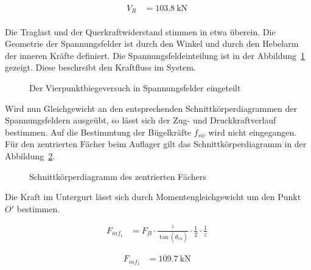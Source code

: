 \documentclass[
  11pt,
  letterpaper,
]{scrreprt}
\begin{document}
$$
\begin{aligned}
V_{R_{_{}}} &= 103.8\ \mathrm{kN} \;
\end{aligned}
$$

Die Traglast und der Querkraftwiderstand stimmen in etwa überein. Die
Geometrie der Spannungsfelder ist durch den Winkel und durch den
Hebelarm der inneren Kräfte definiert. Die Spannungsfeldeinteilung ist
in der Abbildung~\ref{fig-spannungsfelder_sv14} gezeigt. Diese
beschreibt den Kraftfluss im System.

\begin{figure}[H]


\caption{\label{fig-spannungsfelder_sv14}Der Vierpunktbiegeversuch in
Spannungsfelder eingeteilt}

\end{figure}%

Wird nun Gleichgewicht an den entsprechenden Schnittkörperdiagrammen der
Spannungsfeldern ausgeübt, so lässt sich der Zug- und Druckkraftverlauf
bestimmen. Auf die Bestimmtung der Bügelkräfte \(f_{sw}\) wird nicht
eingegangen. Für den zentrierten Fächer beim Auflager gilt das
Schnittkörperdiagramm in der
Abbildung~\ref{fig-skd_1_spannungsfelder_sv14}.

\begin{figure}[H]


\caption{\label{fig-skd_1_spannungsfelder_sv14}Schnittkörperdiagramm des
zentrierten Fächers}

\end{figure}%

Die Kraft im Untergurt lässt sich durch Momentengleichgewicht um den
Punkt \(O'\) bestimmen.

$$
\begin{aligned}
F_{inf_{1}} &= F_{B} \cdot \frac{ z_{_{}} }{ \tan \left( \theta_{c3_{_{}}} \right) } \cdot \frac{1} { 2 } \cdot \frac{1} { z_{_{}} } \; 
\end{aligned}
$$

$$
\begin{aligned}
F_{inf_{1}} &= 109.7\ \mathrm{kN} \; 
\end{aligned}
$$
\end{document}
